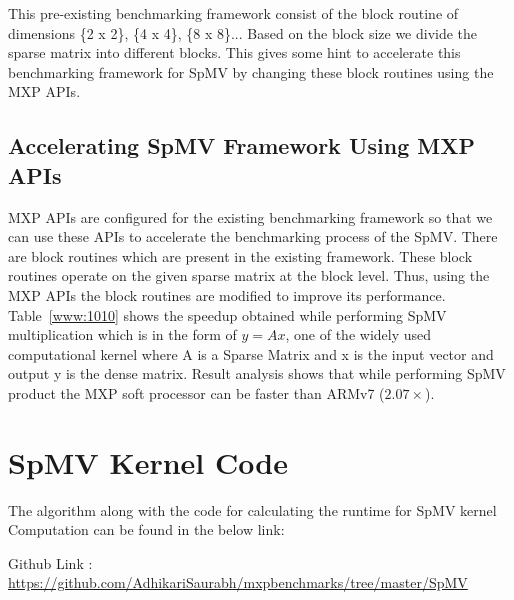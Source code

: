 

This pre-existing benchmarking framework consist of the block routine of dimensions \{2 x 2\}, \{4 x 4\}, \{8 x 8\}... Based on the block size we divide the sparse matrix into different blocks. This gives some hint to accelerate this benchmarking framework for SpMV by changing these block routines using the MXP APIs.


\subsection{Accelerating SpMV Framework Using MXP APIs}

MXP APIs are configured for the existing benchmarking framework so that we can use these APIs to accelerate the benchmarking process of the SpMV. There are block routines which are present in the existing framework. These block routines operate on the given sparse matrix at the block level. Thus, using the MXP APIs the block routines are modified to improve its performance.  Table~\ref{www:1010} shows the speedup obtained while performing SpMV multiplication which is in the form of $y = Ax$, one of the widely used computational kernel where A is a Sparse Matrix and x is the input vector and output y is the dense matrix. Result analysis shows that while performing SpMV product the MXP soft processor can be faster than ARMv7 ($2.07\times$).




\section{SpMV Kernel Code}

The algorithm along with the code for calculating the runtime for SpMV kernel Computation can be found in the below link:

Github Link : \url{https://github.com/AdhikariSaurabh/mxpbenchmarks/tree/master/SpMV}






